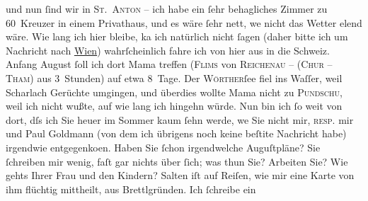 \begin{ledgroupsized}[t]{13cm}
               und nun ſind wir in \textsc{St. Anton} – ich habe ein \introOben{}ſehr behagliches\introOben{}
               Zimmer zu 60 Kreuzer in einem Privat{\pb}haus, und es wäre
               ſehr nett, we{\geminationn} nicht das Wetter elend wäre. Wie lang ich
               hier bleibe, ka{\geminationn} ich natürlich \introOben{}nicht\introOben{} ſagen (daher bitte ich um Nachricht nach \uline{Wien}) wahrſcheinlich fahre ich von hier aus in die Schweiz. Anfang August ſoll ich dort Mama treffen (\textsc{Flims} von \textsc{Reichenau} – (\textsc{Chur} – \textsc{Tham}) aus 3 Stunden) auf etwa {\pb}8 Tage. Der \textsc{Wörther}ſee fiel ins Waſſer, weil Scharlach Gerüchte
               umgingen, und überdies wollte Mama nicht zu \textsc{Pundschu}, weil ich nicht
               wußte, auf wie lang ich hingehn würde. Nun bin ich ſo weit von dort, dſs ich Sie
               heuer im Sommer kaum ſehn werde, we{\geminationn} Sie nicht mir, \textsc{resp}. mir und {\pb}Paul Goldmann (von dem ich übrigens noch keine
                  beſti{\geminationm}te Nachricht habe) irgendwie entgegenko{\geminationm}en.\pend
           \pstart
           Haben Sie ſchon irgendwelche Auguſtpläne? Sie ſchreiben mir wenig, faſt gar nichts
               über ſich; was thun Sie? Arbeiten Sie? Wie gehts Ihrer Frau und den Kindern?\pend
           \pstart
           Salten iſt auf Reiſen, {\pb}wie mir eine Karte von ihm flüchtig mittheilt, aus Brettlgründen. Ich ſchreibe ein

\end{ledgroupsized}
